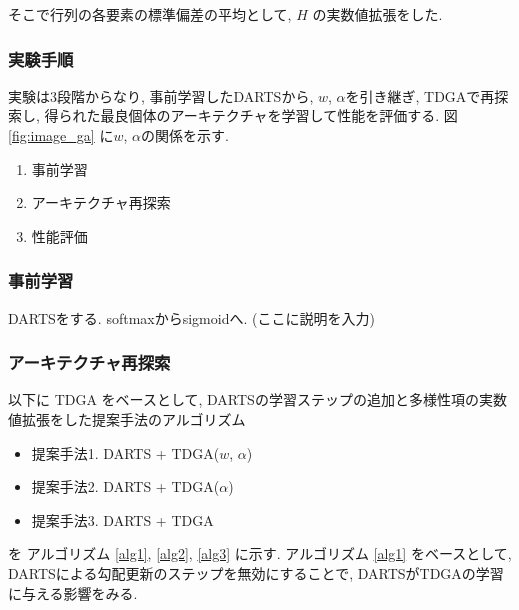 そこで行列の各要素の標準偏差の平均として, $H$ の実数値拡張をした.


\subsubsection{実験手順}
実験は3段階からなり, 事前学習したDARTSから, $w$, $\alpha$を引き継ぎ,
TDGAで再探索し, 得られた最良個体のアーキテクチャを学習して性能を評価する.
図 \ref{fig:image_ga} に$w$, $\alpha$の関係を示す.

\begin{enumerate}
  \item 事前学習
  \item アーキテクチャ再探索
  \item 性能評価
\end{enumerate}

\subsubsection{事前学習}
DARTSをする.
softmaxからsigmoidへ.
(ここに説明を入力)


\subsubsection{アーキテクチャ再探索}

以下に TDGA をベースとして, DARTSの学習ステップの追加と多様性項の実数値拡張をした提案手法のアルゴリズム

\begin{itemize}
  \item 提案手法1. DARTS + TDGA($w$, $\alpha$)
  \item 提案手法2. DARTS + TDGA($\alpha$)
  \item 提案手法3. DARTS + TDGA
\end{itemize}

\noindent
を アルゴリズム \ref{alg1}, \ref{alg2}, \ref{alg3} に示す.
アルゴリズム \ref{alg1} をベースとして, DARTSによる勾配更新のステップを無効にすることで,
DARTSがTDGAの学習に与える影響をみる.

